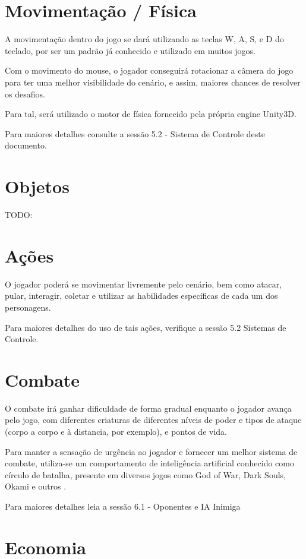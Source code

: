 \section{Movimentação / Física}
A movimentação dentro do jogo se dará utilizando as teclas W, A, S, e D do teclado, por ser um padrão já conhecido e utilizado em muitos jogos.

Com o movimento do mouse, o jogador conseguirá rotacionar a câmera do jogo para ter uma melhor visibilidade do cenário, e assim, maiores chances de resolver os desafios.

Para tal, será utilizado o motor de física fornecido pela própria engine Unity3D.

Para maiores detalhes consulte a sessão 5.2 - Sistema de Controle deste documento.

\section{Objetos}

TODO:

\section{Ações}
O jogador poderá se movimentar livremente pelo cenário, bem como atacar, pular, interagir, coletar e utilizar as habilidades específicas de cada um dos personagens.

Para maiores detalhes do uso de tais ações, verifique a sessão 5.2 Sistemas de Controle.

\section{Combate}
O combate irá ganhar dificuldade de forma gradual enquanto o jogador avança pelo jogo, com diferentes criaturas de diferentes níveis de poder e tipos de ataque (corpo a corpo e à distancia, por exemplo), e pontos de vida. 

Para manter a sensação de urgência ao jogador e fornecer um melhor sistema de combate, utiliza-se um comportamento de inteligência artificial conhecido como círculo de batalha, presente em diversos jogos como God of War, Dark Souls, Okami e outros \cite{BattleCi}.

Para maiores detalhes leia a sessão 6.1 - Oponentes e IA Inimiga

\section{Economia}

